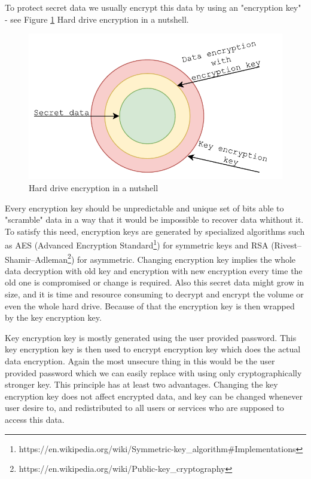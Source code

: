 To protect secret data we usually encrypt this data by using an "encryption key" - see Figure \ref{fig_encdata} Hard drive encryption in a nutshell.
\begin{figure}[h]
    \centering
    \includegraphics[scale=0.7]{figures/HowWeEncryptData.pdf}
    \caption{Hard drive encryption in a nutshell}
    \label{fig_encdata}
\end{figure}
Every encryption key should be unpredictable and unique set of bits able to "scramble" data in a way that it would be impossible to recover data whithout it.
To satisfy this need, encryption keys are generated by specialized algorithms such as AES (Advanced Encryption Standard\footnote{https://en.wikipedia.org/wiki/Symmetric-key\_algorithm\#Implementations}) for symmetric keys and RSA (Rivest–Shamir–Adleman\footnote{https://en.wikipedia.org/wiki/Public-key\_cryptography}) for asymmetric.
Changing encryption key implies the whole data decryption with old key and encryption with new encryption every time the old one is compromised or change is required.
Also this secret data might grow in size, and it is time and resource consuming to decrypt and encrypt the volume or even the whole hard drive.
Because of that the encryption key is then wrapped by the key encryption key.

Key encryption key is mostly generated using the user provided password.
This key encryption key is then used to encrypt encryption key which does the actual data encryption.
Again the most unsecure thing in this would be the user provided password which we can easily replace with using only cryptographically stronger key.
This principle has at least two advantages.
Changing the key encryption key does not affect encrypted data, and key can be changed whenever user desire to, and redistributed to all users or services who are supposed to access this data.

